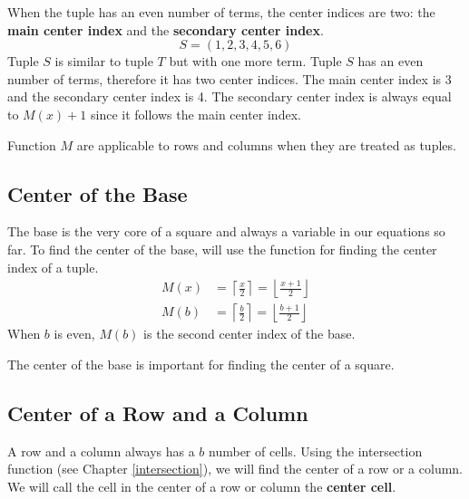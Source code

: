 \documentclass[letterpaper, twoside,12pt]{article}
\begin{document}
    When the tuple has an even number of terms, the center indices are two: the \textbf{main center index} and the \textbf{secondary center index}.
    \begin{equation*}
        S = (1,2,3,4,5,6)
    \end{equation*}
    Tuple $S$ is similar to tuple $T$ but with one more term. Tuple $S$ has an even number of terms, therefore it has two center indices. The main center index is 3 and the secondary center index is 4. The secondary center index is always equal to $M(x) + 1$ since it follows the main center index.

    Function $M$ are applicable to rows and columns when they are treated as tuples.

    \subsection{Center of the Base} \label{center_base}
    The base is the very core of a square and always a variable in our equations so far. To find the center of the base, will use the function for finding the center index of a tuple.
    \begin{equation}
        \begin{split}
            M(x) &= \left\lceil \frac{x}{2} \right\rceil = \left\lfloor \frac{x+1}{2} \right\rfloor \\
            M(b) &= \left\lceil \frac{b}{2} \right\rceil = \left\lfloor \frac{b+1}{2} \right\rfloor
        \end{split}
    \end{equation}
    When $b$ is even, $M(b)$ is the second center index of the base.

    The center of the base is important for finding the center of a square.

    \subsection{Center of a Row and a Column} \label{center_row_column}
    A row and a column always has a $b$ number of cells. Using the intersection function (see Chapter \ref{intersection}), we will find the center of a row or a column. We will call the cell in the center of a row or column the \textbf{center cell}.
\end{document}
